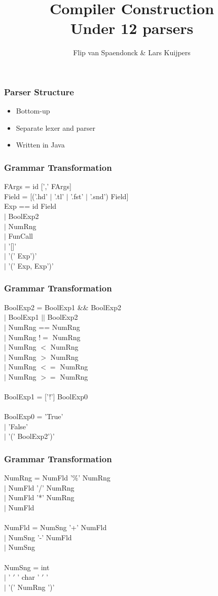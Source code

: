\documentclass{beamer}
\author{Flip van Spaendonck \& Lars Kuijpers}
\title{Compiler Construction \\ Under 12 parsers}
\begin{document}
\begin{frame}
\titlepage
\end{frame}

\begin{frame}
\frametitle{Parser Structure}
\begin{itemize}
\item Bottom-up
\item Separate lexer and parser
\item Written in Java
\end{itemize}
\end{frame}

\begin{frame}
\frametitle{Grammar Transformation}
FArgs = id [',' FArgs]\\
Field = [('.hd' $|$ '.tl' $|$ '.fst' $|$ '.snd') Field]\\
Exp == id Field \\
$|$ BoolExp2\\
$|$ NumRng\\
$|$ FunCall\\
$|$ '[]'\\
$|$ '(' Exp')'\\
$|$ '(' Exp, Exp')'
\end{frame}

\begin{frame}
\frametitle{Grammar Transformation}
BoolExp2 = BoolExp1 \&\& BoolExp2\\
$|$ BoolExp1 $||$ BoolExp2\\
$|$ NumRng == NumRng\\
$|$ NumRng $!=$ NumRng\\
$|$ NumRng $<$ NumRng\\
$|$ NumRng $>$ NumRng\\
$|$ NumRng $<=$ NumRng\\
$|$ NumRng $>=$ NumRng\\
\quad\\
BoolExp1 = ['!'] BoolExp0\\
\quad\\
BoolExp0 = 'True'\\
$|$ 'False'\\
$|$ '(' BoolExp2')'
\end{frame}

\begin{frame}
\frametitle{Grammar Transformation}
NumRng = NumFld '\%' NumRng\\
$|$ NumFld '/' NumRng\\
$|$ NumFld '*' NumRng\\
$|$ NumFld\\
\quad\\
NumFld = NumSng '+' NumFld\\
$|$ NumSng '-' NumFld\\
$|$ NumSng\\
\quad\\
NumSng = int\\
$|$ ' $'$ ' char ' $'$ '\\
$|$ '(' NumRng ')'\\
\end{frame}
\end{document}
